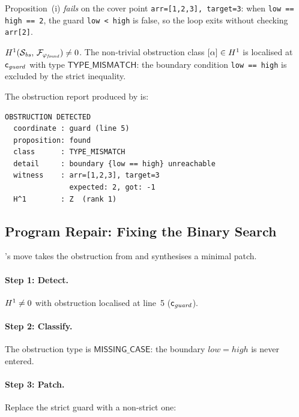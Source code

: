 Proposition~(i) \emph{fails} on the cover point
\texttt{arr=[1,2,3], target=3}: when \texttt{low == high == 2}, the
guard \texttt{low < high} is false, so the loop exits without
checking \texttt{arr[2]}.

\begin{theorem}\label{thm:binsearch-obs}
$H^{1}(\mathcal{S}_{\mathit{bs}},\, \mathcal{F}_{\varphi_{\mathit{found}}})
\neq 0$.
The non-trivial obstruction class
$[\alpha] \in H^{1}$
is localised at $\mathsf{c}_{\mathit{guard}}$ with type
$\mathsf{TYPE\_MISMATCH}$: the boundary condition
\texttt{low == high} is excluded by the strict inequality.
\end{theorem}

The obstruction report produced by \JuGeo{} is:
\begin{lstlisting}[style=jugeo-output,caption={Obstruction report for buggy binary search.},label={lst:obs-report}]
OBSTRUCTION DETECTED
  coordinate : guard (line 5)
  proposition: found
  class      : TYPE_MISMATCH
  detail     : boundary {low == high} unreachable
  witness    : arr=[1,2,3], target=3
               expected: 2, got: -1
  H^1        : Z  (rank 1)
\end{lstlisting}


\subsection{Program Repair: Fixing the Binary Search}%
\label{sec:app-repair}

\JuGeo{}'s \REPAIR{} move takes the obstruction from
 and synthesises a minimal patch.

\paragraph{Step 1: Detect.}
$H^{1} \neq 0$ with obstruction localised at line~5
($\mathsf{c}_{\mathit{guard}}$).

\paragraph{Step 2: Classify.}
The obstruction type is $\mathsf{MISSING\_CASE}$: the boundary
$\mathit{low} = \mathit{high}$ is never entered.

\paragraph{Step 3: Patch.}
Replace the strict guard with a non-strict one:

